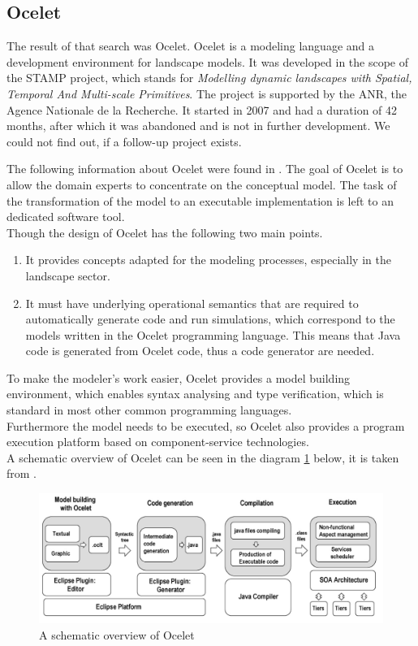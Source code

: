 \subsection{Ocelet}
\par
The result of that search was Ocelet. Ocelet is a modeling language and a development environment for landscape models. It was developed in the scope of the STAMP project, which stands for \emph{Modelling dynamic landscapes with Spatial, Temporal And Multi-scale Primitives}. \autocite{dsl:ocelet-wiki} The project is supported by the ANR, the Agence Nationale de la Recherche. It started in 2007 and had a duration of 42 months, after which it was abandoned and is not in further development. We could not find out, if a follow-up project exists.
\par
The following information about Ocelet were found in \autocite{dsl:ocelet-design}. The goal of Ocelet is to allow the domain experts to concentrate on the conceptual model. The task of the transformation of the model to an executable implementation is left to an dedicated software tool.  \\
Though the design of Ocelet has the following two main points.
\begin{enumerate}
	\item It provides concepts adapted for the modeling processes, especially in the landscape sector.
	\item It must have underlying operational semantics that are required to automatically generate code and run simulations, which correspond to the models written in the Ocelet programming language. This means that Java code is generated from Ocelet code, thus a code generator are needed.
\end{enumerate}
To make the modeler’s work easier, Ocelet provides a model building environment, which enables syntax analysing and type verification, which is standard in most other common programming languages. \\
Furthermore the model needs to be executed, so Ocelet also provides a program execution platform based on component-service technologies. \\
A schematic overview of Ocelet can be seen in the diagram \ref{fig:ocelet_modelling_and_simulation_framework} below, it is taken from \autocite{dsl:ocelet-design}.
\begin{figure}[h]
	\centering
	\includegraphics[width=1.0\textwidth]{pics/ocelet/ocelet_modelling_and_simulation_framework.png}
	\caption{A schematic overview of Ocelet \label{fig:ocelet_modelling_and_simulation_framework}}	
\end{figure}

